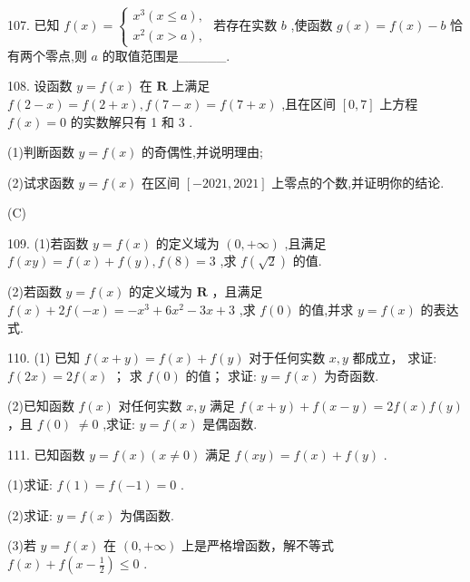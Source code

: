 \documentclass[10pt]{article}
\newcommand*\circled[1]{\tikz[baseline=(char.base)]{\node[shape=circle,draw,inner sep=1.5pt] (char) {\small #1};}}
\begin{document}
107. 已知 \(f\left( x\right)  = \left\{  \begin{array}{l} {x}^{3}\left( {x \leq  a}\right) , \\  {x}^{2}\left( {x > a}\right) , \end{array}\right.\) 若存在实数 \(b\) ,使函数 \(g\left( x\right)  = f\left( x\right)  - b\) 恰有两个零点,则 \(a\) 的取值范围是\_\_\_\_\_.

108. 设函数 \(y = f\left( x\right)\) 在 \(\mathbf{R}\) 上满足 \(f\left( {2 - x}\right)  = f\left( {2 + x}\right) ,f\left( {7 - x}\right)  = f\left( {7 + x}\right)\) ,且在区间 \(\left\lbrack  {0,7}\right\rbrack\) 上方程 \(f\left( x\right)  = 0\) 的实数解只有 1 和 3 .

(1)判断函数 \(y = f\left( x\right)\) 的奇偶性,并说明理由;

(2)试求函数 \(y = f\left( x\right)\) 在区间 \(\left\lbrack  {-{2021},{2021}}\right\rbrack\) 上零点的个数,并证明你的结论.

(C)

109. (1)若函数 \(y = f\left( x\right)\) 的定义域为 \(\left( {0, + \infty }\right)\) ,且满足 \(f\left( {xy}\right)  = f\left( x\right)  + f\left( y\right) ,f\left( 8\right)  = 3\) ,求 \(f\left( \sqrt{2}\right)\) 的值.

(2)若函数 \(y = f\left( x\right)\) 的定义域为 \(\mathbf{R}\) ，且满足 \(f\left( x\right)  + {2f}\left( {-x}\right)  =  - {x}^{3} + 6{x}^{2} - {3x} + 3\) ,求 \(f\left( 0\right)\) 的值,并求 \(y = f\left( x\right)\) 的表达式.

110. (1) 已知 \(f\left( {x + y}\right)  = f\left( x\right)  + f\left( y\right)\) 对于任何实数 \(x,y\) 都成立， \circled{1}  求证: \(f\left( {2x}\right)  = {2f}\left( x\right)\) ；  \circled{2}  求 \(f\left( 0\right)\) 的值； \circled{3}  求证: \(y = f\left( x\right)\) 为奇函数.

(2)已知函数 \(f\left( x\right)\) 对任何实数 \(x,y\) 满足 \(f\left( {x + y}\right)  + f\left( {x - y}\right)  = {2f}\left( x\right) f\left( y\right)\) ，且 \(f\left( 0\right) \; \neq  0\) ,求证: \(y = f\left( x\right)\) 是偶函数.

111. 已知函数 \(y = f\left( x\right) \left( {x \neq  0}\right)\) 满足 \(f\left( {xy}\right)  = f\left( x\right)  + f\left( y\right)\) .

(1)求证: \(f\left( 1\right)  = f\left( {-1}\right)  = 0\) .

(2)求证: \(y = f\left( x\right)\) 为偶函数.

(3)若 \(y = f\left( x\right)\) 在 \(\left( {0, + \infty }\right)\) 上是严格增函数，解不等式 \(f\left( x\right)  + f\left( {x - \frac{1}{2}}\right)  \leq  0\) .
\end{document}
